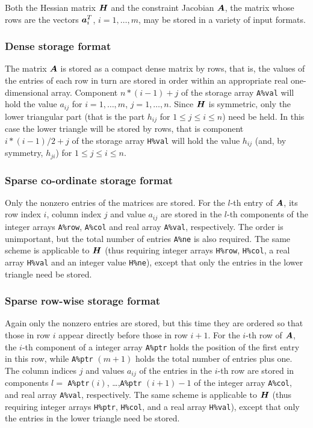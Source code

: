 \documentclass{galahad}
\begin{document}

\galmatrix
Both the Hessian matrix ${\bm{H}}$ and
the constraint Jacobian ${\bm{A}}$, the matrix 
whose rows are the vectors ${\bm{a}}_{i}^{T}$, $i = 1, \ldots , m$, 
may be stored in a variety of input formats.

\subsubsection{Dense storage format}\label{dense}
The matrix ${\bm{A}}$ is stored as a compact 
dense matrix by rows, that is, the values of the entries of each row in turn are
stored in order within an appropriate real one-dimensional array.
Component $n \ast (i-1) + j$ of the storage array {\tt A\%val} will hold the 
value $a_{ij}$ for $i = 1, \ldots , m$, $j = 1, \ldots , n$.
Since ${\bm{H}}$ is symmetric, only the lower triangular part (that is the part 
$h_{ij}$ for $1 \leq j \leq i \leq n$) need be held. In this case
the lower triangle will be stored by rows, that is 
component $i \ast (i-1)/2 + j$ of the storage array {\tt H\%val}  
will hold the value $h_{ij}$ (and, by symmetry, $h_{ji}$)
for $1 \leq j \leq i \leq n$.

\subsubsection{Sparse co-ordinate storage format}\label{coordinate}
Only the nonzero entries of the matrices are stored. For the 
$l$-th entry of ${\bm{A}}$, its row index $i$, column index $j$ 
and value $a_{ij}$
are stored in the $l$-th components of the integer arrays {\tt A\%row}, 
{\tt A\%col} and real array {\tt A\%val}, respectively.
The order is unimportant, but the total
number of entries {\tt A\%ne} is also required. 
The same scheme is applicable to
${\bm{H}}$ (thus requiring integer arrays {\tt H\%row}, {\tt H\%col}, a real array 
{\tt H\%val} and an integer value {\tt H\%ne}),
except that only the entries in the lower triangle need be stored.

\subsubsection{Sparse row-wise storage format}\label{rowwise}
Again only the nonzero entries are stored, but this time
they are ordered so that those in row $i$ appear directly before those
in row $i+1$. For the $i$-th row of ${\bm{A}}$, the $i$-th component of a 
integer array {\tt A\%ptr} holds the position of the first entry in this row,
while {\tt A\%ptr} $(m+1)$ holds the total number of entries plus one.
The column indices $j$ and values $a_{ij}$ of the entries in the $i$-th row 
are stored in components 
$l =$ {\tt A\%ptr}$(i)$, \ldots ,{\tt A\%ptr} $(i+1)-1$ of the 
integer array {\tt A\%col}, and real array {\tt A\%val}, respectively. 
The same scheme is applicable to
${\bm{H}}$ (thus requiring integer arrays {\tt H\%ptr}, {\tt H\%col}, and 
a real array {\tt H\%val}),
except that only the entries in the lower triangle need be stored.
\end{document}
